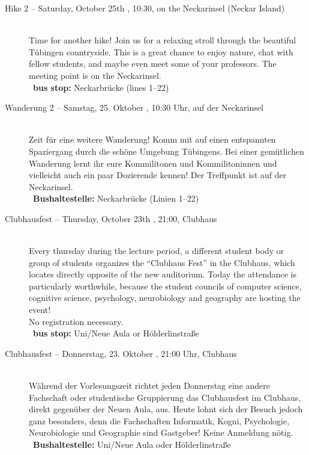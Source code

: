 \begin{description}
\ifml
    \item[Hike 2 -- Saturday, October 25th \YEAR, 10:30, on the Neckarinsel (Neckar Island)]~\\
    Time for another hike! Join us for a relaxing stroll through the beautiful Tübingen countryside.
    This is a great chance to enjoy nature, chat with fellow students, and maybe even meet some of your professors.
    The meeting point is on the Neckarinsel.\\
    ~\textbf{bus stop:} Neckarbrücke (lines 1--22)
\else
    \item[Wanderung 2 -- Samstag, 25. Oktober \YEAR, 10:30 Uhr, auf der Neckarinsel]~\\
    Zeit für eine weitere Wanderung! Komm mit auf einen entspannten Spaziergang durch die schöne Umgebung Tübingens.
    Bei einer gemütlichen Wanderung lernt ihr eure Kommilitonen und Kommilitoninnen
    und vielleicht auch ein paar Dozierende kennen!
    Der Treffpunkt ist auf der Neckarinsel.\\
    ~\textbf{Bushaltestelle:} Neckarbrücke (Linien 1--22)
\fi

\ifml
    \item[Clubhausfest -- Thursday, October 23th \YEAR, 21:00, Clubhaus]\ \\
    Every thursday during the lecture period, a different student body or group of students organizes the "`Clubhaus Fest"' in
    the Clubhaus, which locates directly opposite of the new auditorium. Today the attendance is particularly worthwhile, because
    the student councils of computer science, cognitive science, psychology, neurobiology and geography are hosting the event! \\
    No registration necessary.\\
    ~\textbf{bus stop:} Uni/Neue Aula or Hölderlinstraße
\else
    \item[Clubhausfest -- Donnerstag, 23. Oktober \YEAR, 21:00 Uhr, Clubhaus]\ \\
    Während der Vorlesungszeit richtet jeden Donnerstag eine andere Fachschaft oder studentische Gruppierung das Clubhausfest
    im Clubhaus, direkt gegenüber der Neuen Aula, aus. Heute lohnt sich der Besuch jedoch ganz besonders, denn die Fachschaften
    Informatik, Kogni, Psychologie, Neurobiologie und Geographie sind Gastgeber! %
    Keine Anmeldung nötig.\\
    ~\textbf{Bushaltestelle:} Uni/Neue Aula oder Hölderlinstraße
\fi


\end{description}
